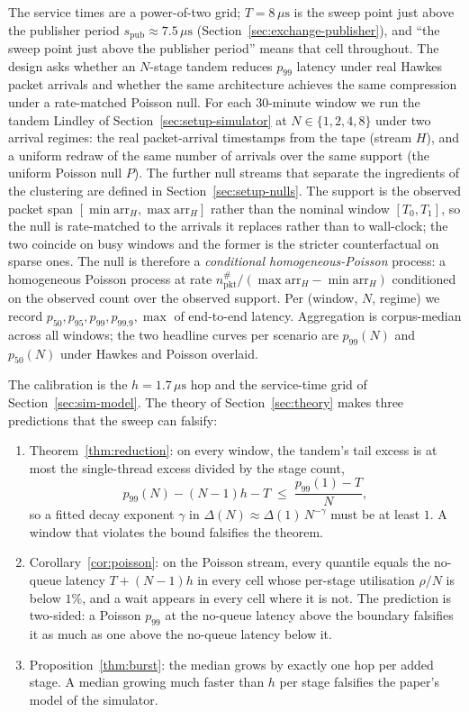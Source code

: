 \documentclass[11pt]{article}
\newcommand{\spub}{s_{\mathrm{pub}}}
\begin{document}
The service times are a power-of-two grid; $T = 8\,\mu\mathrm{s}$ is the sweep point just
above the publisher period $\spub \approx 7.5\,\mu\mathrm{s}$ (Section~\ref{sec:exchange-publisher}),
and ``the sweep point just above the publisher period'' means that cell throughout.
The design asks whether an $N$-stage tandem reduces $p_{99}$ latency under real Hawkes
packet arrivals and whether the same architecture achieves the same compression under a
rate-matched Poisson null. For each 30-minute window we run the tandem Lindley of Section~\ref{sec:setup-simulator}
at $N \in \{1, 2, 4, 8\}$ under two arrival regimes: the real packet-arrival timestamps
from the tape (stream $H$), and a uniform redraw of the same number of arrivals over the
same support (the uniform Poisson null $P$). The further null streams that separate the
ingredients of the clustering are defined in Section~\ref{sec:setup-nulls}. The
support is the observed packet span $[\min \text{arr}_H, \max \text{arr}_H]$ rather than
the nominal window $[T_0, T_1]$, so the null is rate-matched to the arrivals it replaces
rather than to wall-clock; the two coincide on busy windows and the former is the stricter
counterfactual on sparse ones. The null is therefore a \emph{conditional
homogeneous-Poisson} process: a homogeneous Poisson process at rate $n_{\mathrm{pkt}}^{\#}
/ (\max \text{arr}_H - \min \text{arr}_H)$ conditioned on the observed count over the
observed support. Per (window, $N$, regime) we record $p_{50}, p_{95}, p_{99}, p_{99.9},
\max$ of end-to-end latency. Aggregation is corpus-median across all windows; the two
headline curves per scenario are $p_{99}(N)$ and $p_{50}(N)$ under Hawkes and Poisson
overlaid.

The calibration is the $h = 1.7\,\mu\mathrm{s}$ hop and the service-time grid of
Section~\ref{sec:sim-model}. The theory of Section~\ref{sec:theory} makes three
predictions that the sweep can falsify:
\begin{enumerate}
    \item Theorem~\ref{thm:reduction}: on every window, the tandem's tail excess is at most
the single-thread excess divided by the stage count,
\[
p_{99}(N) - (N-1)h - T \;\le\; \frac{p_{99}(1) - T}{N} ,
\]
so a fitted decay exponent $\gamma$ in $\Delta(N) \approx \Delta(1)\,N^{-\gamma}$ must be
at least $1$. A window that violates the bound falsifies the theorem.
    \item Corollary~\ref{cor:poisson}: on the Poisson stream, every quantile equals the
no-queue latency $T + (N-1)h$ in every cell whose per-stage utilisation $\rho/N$ is
below $1\%$, and a wait appears in every cell where it is not. The prediction is two-sided:
a Poisson $p_{99}$ at the no-queue latency above the boundary falsifies it as much as one
above the no-queue latency below it.
    \item Proposition~\ref{thm:burst}: the median grows by exactly one hop per added stage.
A median growing much faster than $h$ per stage falsifies the paper's model of the
simulator.
\end{enumerate}
\end{document}
